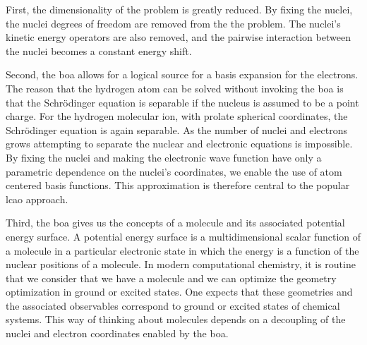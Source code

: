 First, the dimensionality of the problem is greatly reduced.
By fixing the nuclei, the nuclei degrees of freedom are removed from the the problem.
The nuclei's kinetic energy operators are also removed, and the pairwise interaction between the nuclei becomes a constant energy shift.

Second, the \gls{boa} allows for a logical source for a basis expansion for the electrons.
The reason that the hydrogen atom can be solved without invoking the \gls{boa} is that the Schr{\"o}dinger equation is separable if the nucleus is assumed to be a point charge.
For the hydrogen molecular ion, with prolate spherical coordinates, the Schr{\"o}dinger equation is again separable.\cite{10.1088/0370-1328/71/5/312}
As the number of nuclei and electrons grows attempting to separate the nuclear and electronic equations is impossible.
By fixing the nuclei and making the electronic wave function have only a parametric dependence on the nuclei's coordinates, we enable the use of atom centered basis functions.
This approximation is therefore central to the popular \gls{lcao} approach.

Third, the \gls{boa} gives us the concepts of a molecule and its associated potential energy surface.
A potential energy surface is a multidimensional scalar function of a molecule in a particular electronic state in which the energy is a function of the nuclear positions of a molecule.
In modern computational chemistry, it is routine that we consider that we have a molecule and we can optimize the geometry optimization in ground or excited states.
One expects that these geometries and the associated observables correspond to ground or excited states of chemical systems.
This way of thinking about molecules depends on a decoupling of the nuclei and electron coordinates enabled by the \gls{boa}.
